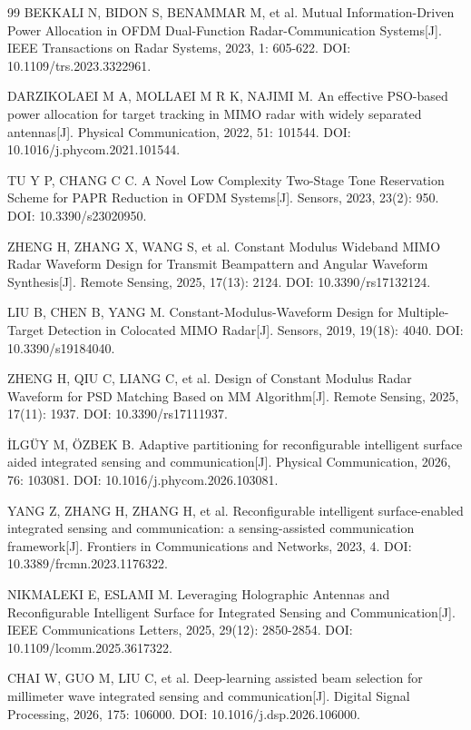 \begin{thebibliography}{99}
 BEKKALI N, BIDON S, BENAMMAR M, et al. Mutual Information-Driven Power Allocation in OFDM Dual-Function Radar-Communication Systems[J]. IEEE Transactions on Radar Systems, 2023, 1: 605-622. DOI: 10.1109/trs.2023.3322961.

 DARZIKOLAEI M A, MOLLAEI M R K, NAJIMI M. An effective PSO-based power allocation for target tracking in MIMO radar with widely separated antennas[J]. Physical Communication, 2022, 51: 101544. DOI: 10.1016/j.phycom.2021.101544.

 TU Y P, CHANG C C. A Novel Low Complexity Two-Stage Tone Reservation Scheme for PAPR Reduction in OFDM Systems[J]. Sensors, 2023, 23(2): 950. DOI: 10.3390/s23020950.

 ZHENG H, ZHANG X, WANG S, et al. Constant Modulus Wideband MIMO Radar Waveform Design for Transmit Beampattern and Angular Waveform Synthesis[J]. Remote Sensing, 2025, 17(13): 2124. DOI: 10.3390/rs17132124.

 LIU B, CHEN B, YANG M. Constant-Modulus-Waveform Design for Multiple-Target Detection in Colocated MIMO Radar[J]. Sensors, 2019, 19(18): 4040. DOI: 10.3390/s19184040.

 ZHENG H, QIU C, LIANG C, et al. Design of Constant Modulus Radar Waveform for PSD Matching Based on MM Algorithm[J]. Remote Sensing, 2025, 17(11): 1937. DOI: 10.3390/rs17111937.

 İLGÜY M, ÖZBEK B. Adaptive partitioning for reconfigurable intelligent surface aided integrated sensing and communication[J]. Physical Communication, 2026, 76: 103081. DOI: 10.1016/j.phycom.2026.103081.

 YANG Z, ZHANG H, ZHANG H, et al. Reconfigurable intelligent surface-enabled integrated sensing and communication: a sensing-assisted communication framework[J]. Frontiers in Communications and Networks, 2023, 4. DOI: 10.3389/frcmn.2023.1176322.

 NIKMALEKI E, ESLAMI M. Leveraging Holographic Antennas and Reconfigurable Intelligent Surface for Integrated Sensing and Communication[J]. IEEE Communications Letters, 2025, 29(12): 2850-2854. DOI: 10.1109/lcomm.2025.3617322.

 CHAI W, GUO M, LIU C, et al. Deep-learning assisted beam selection for millimeter wave integrated sensing and communication[J]. Digital Signal Processing, 2026, 175: 106000. DOI: 10.1016/j.dsp.2026.106000.


\end{thebibliography}
